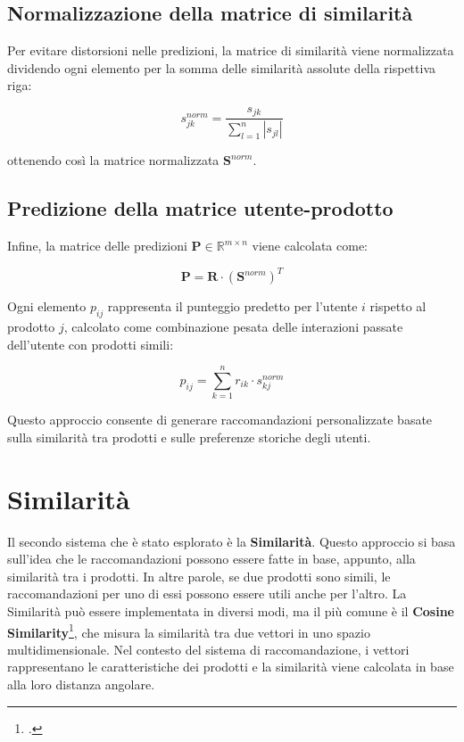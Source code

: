 \subsection{Normalizzazione della matrice di similarità}

Per evitare distorsioni nelle predizioni, la matrice di similarità viene normalizzata dividendo ogni elemento per la somma delle similarità assolute della rispettiva riga:

\begin{equation}
s_{jk}^{norm} = \frac{s_{jk}}{\sum_{l=1}^{n} |s_{jl}|}
\end{equation}

ottenendo così la matrice normalizzata $\mathbf{S}^{norm}$.

\subsection{Predizione della matrice utente-prodotto}

Infine, la matrice delle predizioni $\mathbf{P} \in \mathbb{R}^{m \times n}$ viene calcolata come:

\begin{equation}
\mathbf{P} = \mathbf{R} \cdot (\mathbf{S}^{norm})^T
\end{equation}

Ogni elemento $p_{ij}$ rappresenta il punteggio predetto per l'utente $i$ rispetto al prodotto $j$, calcolato come combinazione pesata delle interazioni passate dell'utente con prodotti simili:

\begin{equation}
p_{ij} = \sum_{k=1}^{n} r_{ik} \cdot s_{kj}^{norm}
\end{equation}

Questo approccio consente di generare raccomandazioni personalizzate basate sulla similarità tra prodotti e sulle preferenze storiche degli utenti.


\section{Similarità}

Il secondo sistema che è stato esplorato è la \textbf{Similarità}. Questo approccio si basa sull'idea che le raccomandazioni possono essere fatte in base, appunto, alla similarità tra i prodotti. In altre parole, se due prodotti sono simili, le raccomandazioni per uno di essi possono essere utili anche per l'altro. La Similarità può essere implementata in diversi modi, ma il più comune è il \textbf{Cosine Similarity}\footcite{site:cosine-similarity}, che misura la similarità tra due vettori in uno spazio multidimensionale. Nel contesto del sistema di raccomandazione, i vettori rappresentano le caratteristiche dei prodotti e la similarità viene calcolata in base alla loro distanza angolare.

